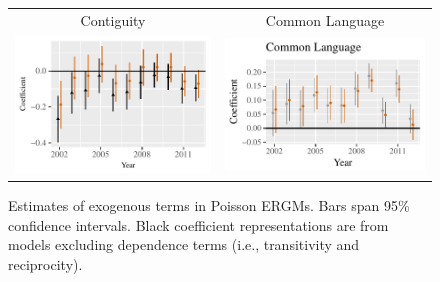 \documentclass{article}
\begin{document}
\begin{figure}[htp]
\begin{tabular}{c@{\hskip -.4cm}c}
Contiguity &
Common Language\\
\includegraphics[height=.22\textheight, clip=true, trim=0cm .5cm 0cm .1cm]{draft_figures/rl_plots/Contiguity.pdf}  &
\includegraphics[height=.22\textheight, clip=true, trim=.5cm .5cm 0cm .1cm]{draft_figures/rl_plots/CommonLanguage.pdf}   \\
\end{tabular}
\caption{\label{fig:effectPlots1} Estimates of exogenous terms in Poisson ERGMs. Bars span 95\% confidence intervals. Black coefficient representations are from models excluding dependence terms (i.e., transitivity and reciprocity).}
\end{figure}
\end{document}
